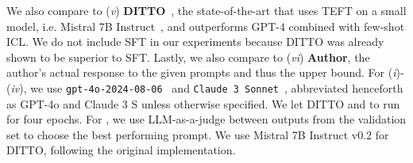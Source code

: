 We also compare \ours to
(\textit{v}) \textbf{DITTO}~\cite{shaikh2024show}, the state-of-the-art that uses TEFT on a small model, i.e. Mistral 7B Instruct~\cite{jiang2023mistral}, and outperforms GPT-4 combined with few-shot ICL. 
We do not include SFT in our experiments because DITTO was already shown to be superior to SFT.
Lastly, we also compare to (\textit{vi}) \textbf{Author}, the author's actual response to the given prompts and thus the upper bound.
For (\textit{i})-(\textit{iv}), we use \texttt{gpt-4o-2024-08-06}~\cite{achiam2023gpt} and \texttt{Claude 3 Sonnet}~\cite{TheC3}, abbreviated henceforth as GPT-4o and Claude 3 S unless otherwise specified. 
We let DITTO and \ours to run for four epochs. For \ours, we use LLM-as-a-judge between outputs from the validation set to choose the best performing prompt. 
We use Mistral 7B Instruct v0.2 for DITTO, following the original implementation. 
